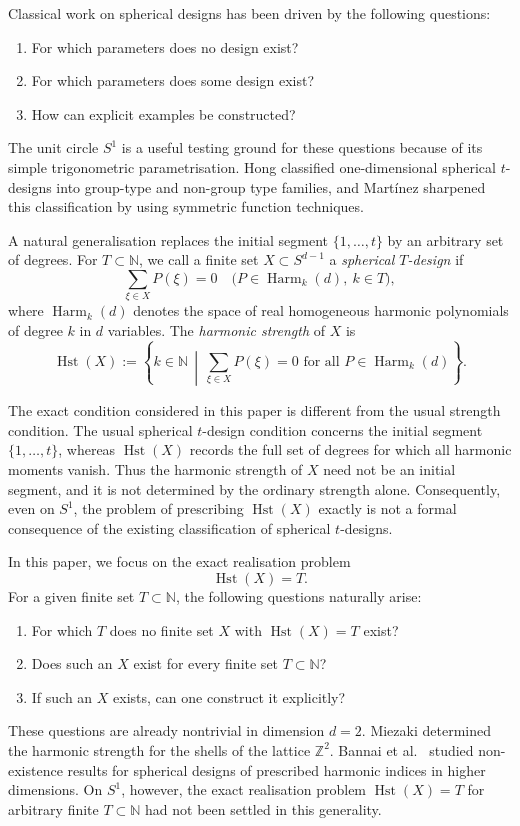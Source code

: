 \documentclass{amsart}
\theoremstyle{definition}
\DeclareMathOperator{\Harm}{Harm}
\DeclareMathOperator{\Hst}{Hst}
\newcommand{\NN}{\mathbb{N}}
\begin{document}
Classical work on spherical designs has been driven by the following questions:
\begin{enumerate}
    \item[(a)] For which parameters does no design exist?
    \item[(b)] For which parameters does some design exist?
    \item[(c)] How can explicit examples be constructed?
\end{enumerate}
The unit circle \(S^1\) is a useful testing ground for these questions because
of its simple trigonometric parametrisation.  Hong \cite{Hong82} classified
one-dimensional spherical \(t\)-designs into group-type and non-group type
families, and Martínez \cite{Martinez22} sharpened this classification by using
symmetric function techniques.

A natural generalisation replaces the initial segment \(\{1,\ldots,t\}\) by an
arbitrary set of degrees.  For \(T\subset\NN\), we call a finite set
\(X\subset S^{d-1}\) a \emph{spherical \(T\)-design} if
\[
  \sum_{\xi\in X}P(\xi)=0
  \quad
  \bigl(P\in\Harm_k(d),\ k\in T\bigr),
\]
where \(\Harm_k(d)\) denotes the space of real homogeneous harmonic polynomials
of degree \(k\) in \(d\) variables.  The \emph{harmonic strength} of \(X\) is
\[
  \Hst(X):=
  \left\{
  k\in\NN
  \,\middle|\,
  \sum_{\xi\in X}P(\xi)=0
  \text{ for all }P\in\Harm_k(d)
  \right\}.
\]

The exact condition considered in this paper is different from the usual
strength condition.  The usual spherical \(t\)-design condition concerns the
initial segment \(\{1,\ldots,t\}\), whereas \(\Hst(X)\) records the full set of
degrees for which all harmonic moments vanish.  Thus the harmonic strength of
\(X\) need not be an initial segment, and it is not determined by the ordinary
strength alone.  Consequently, even on \(S^1\), the problem of prescribing
\(\Hst(X)\) exactly is not a formal consequence of the existing classification
of spherical \(t\)-designs.

In this paper, we focus on the exact realisation problem
\[
  \Hst(X)=T.
\]
For a given finite set \(T\subset\NN\), the following questions naturally arise:
\begin{enumerate}\setlength{\itemsep}{0pt}
    \item[(a')] For which \(T\) does no finite set \(X\) with \(\Hst(X)=T\) exist?
    \item[(b')] Does such an \(X\) exist for every finite set \(T\subset\NN\)?
    \item[(c')] If such an \(X\) exists, can one construct it explicitly?
\end{enumerate}
These questions are already nontrivial in dimension \(d=2\).  Miezaki
\cite{Miezaki13} determined the harmonic strength for the shells of the lattice
\(\mathbb Z^2\).  Bannai et al.\ \cite{ZBBKY17} studied non-existence results
for spherical designs of prescribed harmonic indices in higher dimensions.  On
\(S^1\), however, the exact realisation problem \(\Hst(X)=T\) for arbitrary
finite \(T\subset\NN\) had not been settled in this generality.
\end{document}
